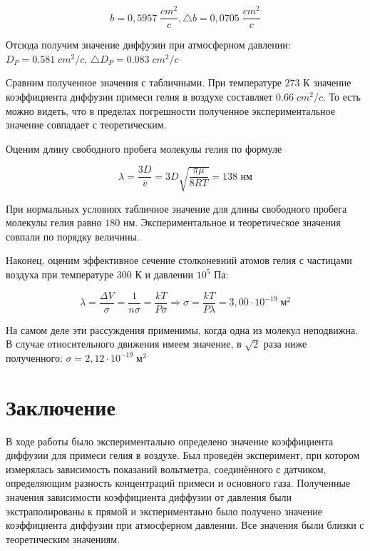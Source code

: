 \documentclass[a4paper, 12pt]{article} %
\begin{document}
\begin{equation}
	b = 0,5957 \; \frac{cm^2}{c}, \triangle b = 0,0705 \; \frac{cm^2}{c} 
\end{equation}

Отсюда получим значение диффузии при атмосферном давлении: $D_P = 0.581 \; cm^2/c$, $\triangle D_P = 0.083 \; cm^2/c$

Сравним полученное значения с табличными. При температуре $273$ К значение коэффициента диффузии примеси гелия в воздухе составляет $0.66 \; cm^2/c$. То есть можно видеть, что в пределах погрешности полученное экспериментальное значение совпадает с теоретическим.

Оценим длину свободного пробега молекулы гелия по формуле 

\begin{equation}
	\lambda = \frac{3D}{\bar v}  = 3D \sqrt{\frac{\pi \mu }{8RT}} = 138 \text{ нм}
\end{equation}

При нормальных условиях табличное значение для длины свободного пробега молекулы гелия равно $180$ нм. Экспериментальное и теоретическое значения совпали по порядку величины.

Наконец, оценим эффективное сечение столконевний атомов гелия с частицами воздуха при температуре $300$ К и давлении $10^5$ Па:

\begin{equation}
	\lambda = \frac{\Delta V}{\sigma} = \frac{1}{n \sigma} = \frac{kT}{P \sigma} \Rightarrow \sigma = \frac{kT}{P \lambda} = 3,00 \cdot 10^{-19} \; \text{м}^2
\end{equation}

На самом деле эти рассуждения применимы, когда одна из молекул неподвижна. В случае относительного движения имеем значение, в $\sqrt{2}$ раза ниже полученного: $\sigma = 2,12 \cdot 10^{-19} \; \text{м}^2$

\newpage


\section{Заключение}

В ходе работы было экспериментально определено значение коэффициента диффузии для примеси гелия в воздухе. Был проведён эксперимент, при котором измерялась зависимость показаний вольтметра, соединённого с датчиком, определяющим разность концентраций примеси и основного газа. Полученные значения зависимости коэффициента диффузии от давления были экстраполированы к прямой и экспериментаьно было получено значение коэффициента диффузии при атмосферном давлении. Все значения были близки с теоретическим значениям.
\end{document}
